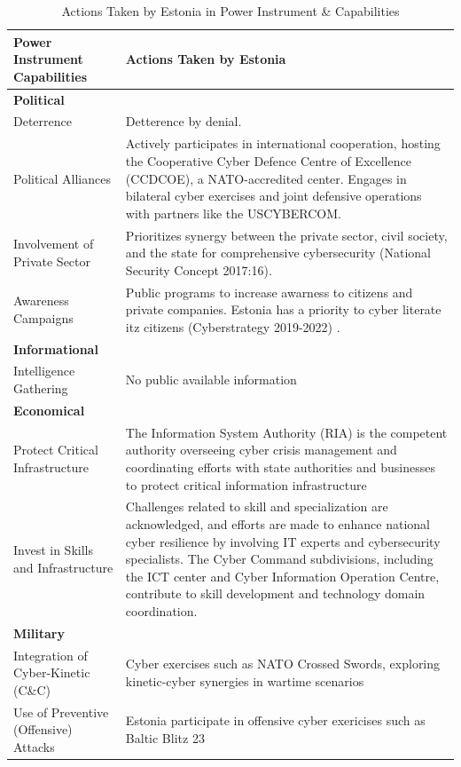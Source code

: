 \begin{table}[h]
\centering
\renewcommand{\arraystretch}{1.5} %
\caption{Actions Taken by Estonia in Power Instrument \& Capabilities}
\begin{tabular}{>{\raggedright}p{4cm} p{11cm}}
\toprule
\textbf{Power Instrument Capabilities} & \textbf{Actions Taken by Estonia} \\
\midrule
\textbf{Political} & \\
\hspace{0.2cm} Deterrence & Detterence by denial. \\
\hspace{0.2cm} Political Alliances &Actively participates in international cooperation, hosting the Cooperative Cyber Defence Centre of Excellence (CCDCOE), a NATO-accredited center. Engages in bilateral cyber exercises and joint defensive operations with partners like the USCYBERCOM. \\
\hspace{0.2cm} Involvement of Private Sector &  Prioritizes synergy between the private sector, civil society, and the state for comprehensive cybersecurity (National Security Concept 2017:16). \\
\hspace{0.2cm} Awareness Campaigns & Public programs to increase awarness to citizens and private companies. Estonia has a priority to cyber literate itz citizens (Cyberstrategy 2019-2022) . \\
\midrule
\textbf{Informational} & \\
\hspace{0.2cm} Intelligence Gathering & No public available information \\
\midrule
\textbf{Economical} & \\
\hspace{0.2cm} Protect Critical Infrastructure & The Information System Authority (RIA) is the competent authority overseeing cyber crisis management and coordinating efforts with state authorities and businesses to protect critical information infrastructure \\
\hspace{0.2cm} Invest in Skills and Infrastructure &  Challenges related to skill and specialization are acknowledged, and efforts are made to enhance national cyber resilience by involving IT experts and cybersecurity specialists. The Cyber Command subdivisions, including the ICT center and Cyber Information Operation Centre, contribute to skill development and technology domain coordination. \\
\midrule
\textbf{Military} & \\
\hspace{0.2cm} Integration of Cyber-Kinetic (C\&C) &  Cyber exercises such as NATO Crossed Swords, exploring kinetic-cyber synergies in wartime scenarios \\
\hspace{0.2cm} Use of Preventive (Offensive) Attacks & Estonia participate in offensive cyber exericises such as Baltic Blitz 23 \\
\bottomrule
\end{tabular}
\end{table}

